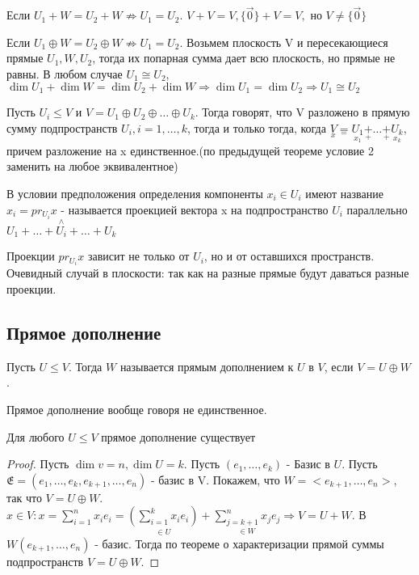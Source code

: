\begin{note}
	Если \(U_1 + W = U_2 + W\not\Longrightarrow U_1 = U_2\). \(V + V = V, \{\vec 0\} + V = V,\) но \(V\ne \{\vec 0\}\)
\end{note}
\begin{note}
	Если \(U_1\oplus W = U_2\oplus W \not \Longrightarrow U_1 = U_2\). Возьмем плоскость V и пересекающиеся прямые \(U_1, W, U_2\), тогда их попарная сумма дает всю плоскость, но прямые не равны. В любом случае \(U_1\cong U_2\), \(\dim U_1 + \dim W = \dim U_2 + \dim W \Longrightarrow \dim U_1 = \dim U_2 \Longrightarrow U_1\cong U_2\)
\end{note}
\begin{definition}
	Пусть \(U_i\le V\) и \(V = U_1\oplus U_2 \oplus\ldots\oplus U_k\). Тогда говорят, что V разложено в прямую сумму подпространств \(U_i, i = 1, \ldots, k\), тогда и только тогда, когда  \newline
	\(\underset{x}{V}\underset{=}{=}\underset{x_1}{U_1}\underset{+}{+}\ldots\underset{+}{+}\underset{x_k}{U_k}\), причем разложение на x единственное.(по предыдущей теореме условие 2 заменить на любое эквивалентное)
\end{definition}
\begin{definition}
	В условии предположения определения компоненты \(x_i\in U_i\) имеют название \(x_i=pr_{U_i}x\) - называется проекцией вектора x на подпространство \(U_i\) параллельно \(U_1+\ldots + \overset{\wedge}{U_i}+\ldots + U_k\)
\end{definition}
\begin{note}
	Проекции \(pr_{U_i}x\) зависит не только от \(U_i\), но и от оставшихся пространств. Очевидный случай в плоскости: так как на разные прямые будут даваться разные проекции.
\end{note}
\subsection{Прямое дополнение}
\begin{definition}
	Пусть \(U\le V\). Тогда \(W\) называется прямым дополнением к \(U\) в \(V\), если \(V = U\oplus W\).
\end{definition}
\begin{note}
	Прямое дополнение вообще говоря не единственное.
\end{note}
\begin{theorem}
	Для любого \(U\le V\) прямое дополнение существует
\end{theorem}
\begin{proof}
	Пусть \(\dim v = n, \dim U = k\). Пусть \((e_1, \ldots, e_k)\) - Базис в \(U\). Пусть \(\mathfrak{E} = (e_1, \ldots, e_k, e_{k+1}, \ldots, e_n)\) - базис в V. Покажем, что \(W = <e_{k+1}, \ldots, e_n>\), так что \(V = U\oplus W\). \(x\in V: x = \sum_{i=1}^{n}x_ie_i= \underset{\in U}{(\sum_{i=1}^{k}x_ie_i)} + \underset{\in W}{\sum_{j = k+1}^{n}x_je_j}\Longrightarrow V = U + W\). В \(W(e_{k+1}, \ldots, e_n)\) - базис. Тогда по теореме о характеризации прямой суммы подпространств \(V = U \oplus W\). 
\end{proof}
